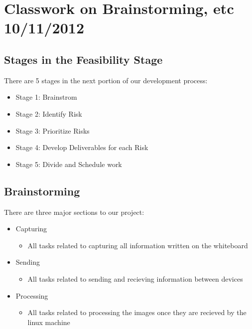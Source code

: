 \documentclass[]{article}
\begin{document}
	\section{Classwork on Brainstorming, etc 10/11/2012}
		\subsection{Stages in the Feasibility Stage}
			There are 5 stages in the next  portion of our development process:
			\begin{itemize}
				\item Stage 1: Brainstrom
				\item Stage 2: Identify Risk
				\item Stage 3: Prioritize Risks
				\item Stage 4: Develop Deliverables for each Risk
				\item Stage 5: Divide and Schedule work
			\end{itemize}
			
			\subsection{Brainstorming}
			There are three major sections to our project:
				\begin{itemize}
					\item Capturing
					\begin{itemize}
						\item All tasks related to capturing all information written on the whiteboard
					\end{itemize}
					\item Sending
					\begin{itemize}
						\item All tasks related to sending and recieving information between devices
					\end{itemize}
					\item Processing
					\begin{itemize}
						\item All tasks related to processing the images once they are recieved by the linux machine
					\end{itemize}
				\end{itemize}
			
\end{document}
